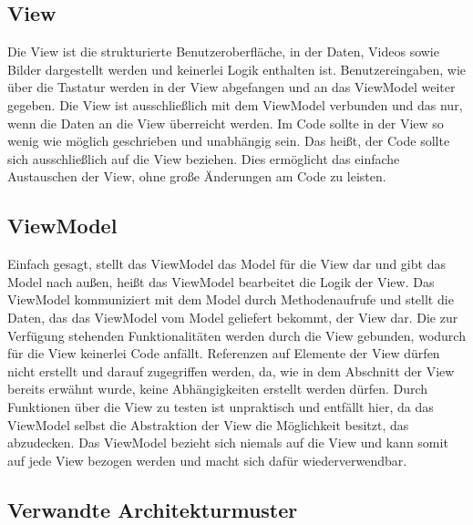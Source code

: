 \subsection*{View}
Die View ist die strukturierte Benutzeroberfl\"ache, in der Daten, Videos sowie Bilder dargestellt werden und keinerlei Logik enthalten ist. Benutzereingaben, wie \"uber die Tastatur werden in der View abgefangen und an das ViewModel weiter gegeben. Die View ist ausschlie\ss{}lich mit dem ViewModel verbunden und das nur, wenn die Daten an die View \"uberreicht werden. Im Code sollte in der View so wenig wie m\"oglich geschrieben und unabh\"angig sein. Das hei\ss{}t, der Code sollte sich ausschlie\ss{}lich auf die View beziehen. Dies erm\"oglicht das einfache Austauschen der View, ohne gro\ss{}e \"Anderungen am Code zu leisten\cite{EderView2017}.

\subsection*{ViewModel}
Einfach gesagt, stellt das ViewModel das Model f\"ur die View dar und gibt das Model nach au\ss{}en, hei\ss{}t das ViewModel bearbeitet die Logik der View. 
Das ViewModel kommuniziert mit dem Model  durch Methodenaufrufe und stellt die Daten, das das ViewModel vom Model geliefert bekommt, der View dar. Die zur Verf\"ugung stehenden Funktionalit\"aten werden durch die View gebunden, wodurch f\"ur die View keinerlei Code anf\"allt.
Referenzen auf Elemente der View d\"urfen nicht erstellt und darauf zugegriffen werden, da, wie in dem Abschnitt der View bereits erw\"ahnt wurde, keine Abh\"angigkeiten erstellt werden d\"urfen. Durch Funktionen \"uber die View zu testen ist unpraktisch und entf\"allt hier, da das ViewModel selbst die Abstraktion der View die M\"oglichkeit besitzt, das abzudecken.
Das ViewModel bezieht sich niemals auf die View und kann somit auf jede View bezogen werden und macht sich daf\"ur wiederverwendbar\cite{EderViewModel2017}.

\subsection{Verwandte Architekturmuster}

 
 
